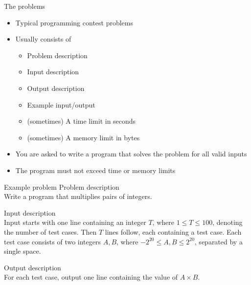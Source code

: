 \documentclass[12pt,t]{beamer}
\newcommand{\bi}{\begin{itemize}}
\newcommand{\ei}{\end{itemize}}
\begin{document}
\begin{frame}{The problems}
    \bi
        \item Typical programming contest problems
        \item Usually consists of
            \bi
                \item Problem description
                \item Input description
                \item Output description
                \item Example input/output
                \item (sometimes) A time limit in seconds
                \item (sometimes) A memory limit in bytes
            \ei
        \item You are asked to write a program that solves the problem for all valid inputs
        \item The program must not exceed time or memory limits
    \ei
\end{frame}

\begin{frame}{Example problem}
    \vspace{10pt}
    {\footnotesize\color{title}Problem description}\\
    Write a program that multiplies pairs of integers.

    \vspace{10pt}

    {\footnotesize\color{title}Input description}\\
    Input starts with one line containing an integer $T$, where $1\leq T \leq
    100$, denoting the number of test cases. Then $T$ lines follow, each
    containing a test case. Each test case consists of two integers $A,B$,
    where $-2^{20} \leq A,B \leq 2^{20}$, separated by a single space.

    \vspace{10pt}

    {\footnotesize\color{title}Output description}\\
    For each test case, output one line containing the value of $A\times B$.
\end{frame}
\end{document}
